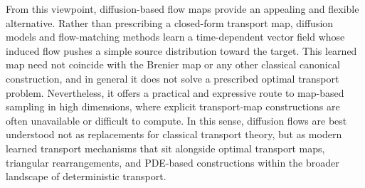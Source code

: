 From this viewpoint, diffusion-based flow maps provide an appealing and
flexible alternative. Rather than prescribing a closed-form transport
map, diffusion models and flow-matching methods learn a time-dependent
vector field whose induced flow pushes a simple source distribution
toward the target. This learned map need not coincide with the Brenier
map or any other classical canonical construction, and in general it
does not solve a prescribed optimal transport problem. Nevertheless, it
offers a practical and expressive route to map-based sampling in high
dimensions, where explicit transport-map constructions are often
unavailable or difficult to compute. In this sense, diffusion flows are
best understood not as replacements for classical transport theory, but
as modern learned transport mechanisms that sit alongside optimal
transport maps, triangular rearrangements, and PDE-based constructions
within the broader landscape of deterministic transport.
\newpage

